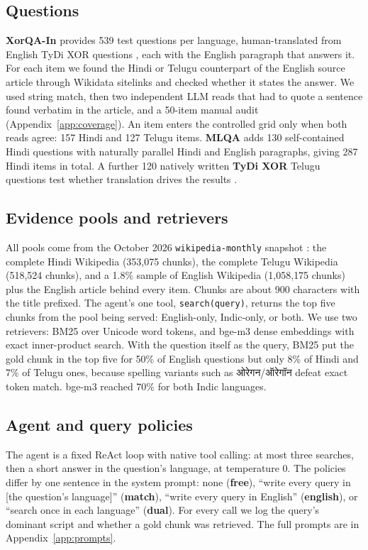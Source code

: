 \subsection{Questions}
\label{sec:questions}
\textbf{XorQA-In} \citep{a2404_16816} provides 539 test questions per language, human-translated from English TyDi XOR questions \citep{a2010_11856}, each with the English paragraph that answers it. For each item we found the Hindi or Telugu counterpart of the English source article through Wikidata sitelinks and checked whether it states the answer. We used string match, then two independent LLM reads that had to quote a sentence found verbatim in the article, and a 50-item manual audit (Appendix~\ref{app:coverage}). An item enters the controlled grid only when both reads agree: 157 Hindi and 127 Telugu items. \textbf{MLQA} \citep{a1910_07475} adds 130 self-contained Hindi questions with naturally parallel Hindi and English paragraphs, giving 287 Hindi items in total. A further 120 natively written \textbf{TyDi XOR} Telugu questions test whether translation drives the results \citep{a2604_24929}.

\subsection{Evidence pools and retrievers}
\label{sec:pool}
All pools come from the October 2026 \texttt{wikipedia-monthly} snapshot \citep{wikipediamonthly2026}: the complete Hindi Wikipedia (353{,}075 chunks), the complete Telugu Wikipedia (518{,}524 chunks), and a 1.8\% sample of English Wikipedia (1{,}058{,}175 chunks) plus the English article behind every item. Chunks are about 900 characters with the title prefixed. The agent's one tool, \texttt{search(query)}, returns the top five chunks from the pool being served: English-only, Indic-only, or both. We use two retrievers: BM25 \citep{robertson2009bm25} over Unicode word tokens, and bge-m3 dense embeddings \citep{a2402_03216} with exact inner-product search. With the question itself as the query, BM25 put the gold chunk in the top five for 50\% of English questions but only 8\% of Hindi and 7\% of Telugu ones, because spelling variants such as {\deva ओरेगन}/{\deva ऑरेगॉन} defeat exact token match. bge-m3 reached 70\% for both Indic languages.

\subsection{Agent and query policies}
\label{sec:agent}
The agent is a fixed ReAct loop \citep{a2210_03629} with native tool calling: at most three searches, then a short answer in the question's language, at temperature 0. The policies differ by one sentence in the system prompt: none (\textbf{free}), ``write every query in [the question's language]'' (\textbf{match}), ``write every query in English'' (\textbf{english}), or ``search once in each language'' (\textbf{dual}). For every call we log the query's dominant script and whether a gold chunk was retrieved. The full prompts are in Appendix~\ref{app:prompts}.


